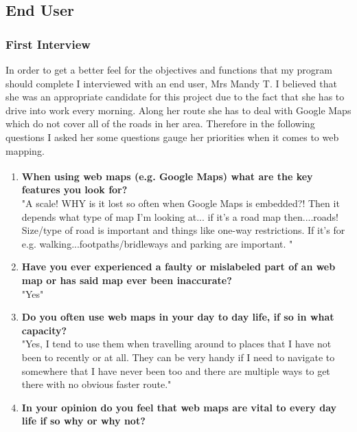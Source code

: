 \begin{FlushLeft}
        \bk
        
        \subsection{End User}
            \subsubsection{First Interview}
            \normalsize
            In order to get a better feel for the objectives and functions that my program should complete I interviewed with an end user, Mrs Mandy T. I believed that she was an appropriate candidate for this
            project due to the fact that she has to drive into work every morning. Along her route she has to deal with Google Maps which do not cover all of the roads in her area. Therefore in the following questions
            I asked her some questions gauge her priorities when it comes to web mapping.
            \bk
            \begin{enumerate}
                \item {\bf{When using web maps (e.g. Google Maps\textsuperscript{\tiny\textcopyright}) what are the key features you look for?}} \\
                \bk
                "A scale! WHY is it lost so often when Google Maps is embedded?! 
                Then it depends what type of map I'm looking at... if it's a road map then....roads! Size/type of road is important and things like one-way restrictions. 
                If it's for e.g. walking...footpaths/bridleways and parking are important. 
                "
                \item {\bf{Have you ever experienced a faulty or mislabeled part of an web map or has said map ever been inaccurate?}} \\
                \bk
                "Yes"
                \item {\bf{Do you often use web maps in your day to day life, if so in what capacity?}} \\
                \bk
                "Yes, I tend to use them when travelling around to places that I have not been to recently or at all. They can be very handy if I need to navigate to somewhere that I have never been too and there are multiple ways to get there with no obvious faster route."
                \item {\bf{In your opinion do you feel that web maps are vital to every day life if so why or why not? }} \\

\end{enumerate}
\end{FlushLeft}
